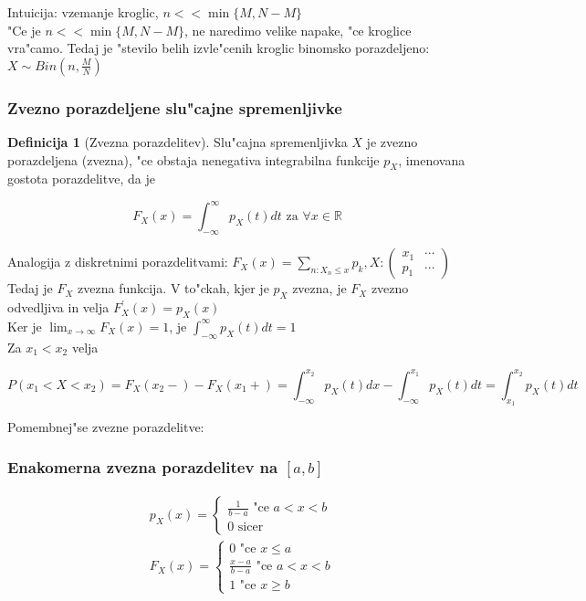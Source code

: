 \documentclass[a4paper,12pt]{article}
\theoremstyle{definition}
\newtheorem{defn}[counter]{Definicija}
\theoremstyle{remark}
\newcommand{\R}{\mathbb{R}}
\begin{document}
Intuicija: vzemanje kroglic, $n << \min\{M, N-M\}$ \\
"Ce je $n << \min\{M, N-M\}$, ne naredimo velike napake, "ce kroglice vra"camo. Tedaj je "stevilo belih
izvle"cenih kroglic binomsko porazdeljeno: $X \sim Bin(n, \frac{M}{N})$

\subsubsection{Zvezno porazdeljene slu"cajne spremenljivke}

\begin{defn}[Zvezna porazdelitev]
    Slu"cajna spremenljivka $X$ je zvezno porazdeljena (zvezna), "ce obstaja nenegativa integrabilna funkcije
    $p_X$, imenovana gostota porazdelitve, da je

    \begin{equation*}
        F_X(x) = \int_{-\infty}^{\infty} p_X(t) dt \text{ za } \forall x \in \R
    \end{equation*}
\end{defn}

Analogija z diskretnimi porazdelitvami: $F_X(x) = \sum_{n: X_n \leq x} p_k, X: \begin{pmatrix}
    x_1 & \cdots \\
    p_1 & \cdots
\end{pmatrix}$ \\
Tedaj je $F_X$ zvezna funkcija. V to"ckah, kjer je $p_X$ zvezna, je $F_X$ zvezno odvedljiva in velja
$F_X^{'}(x) = p_X(x)$ \\
Ker je $\lim_{x \to \infty} F_X(x) = 1$, je $\int_{-\infty}^{\infty} p_X(t) dt = 1$ \\
Za $x_1 < x_2$ velja

\begin{equation*}
    P(x_1 < X < x_2) = F_X(x_2-) - F_X(x_1+) = \int_{-\infty}^{x_2} p_X(t) dx - \int_{-\infty}^{x_1} p_X(t) dt =
    \int_{x_1}^{x_2} p_X(t) dt
\end{equation*}

Pomembnej"se zvezne porazdelitve:

\subsubsection{Enakomerna zvezna porazdelitev na $[a,b]$}

\begin{align*}
    &p_X(x) = \begin{cases}
            \frac{1}{b-a} \text{ "ce } a < x < b \\
            0 \text{ sicer}
        \end{cases} \\
    &F_X(x) = \begin{cases}
        0 \text{ "ce } x \leq a \\
        \frac{x-a}{b-a} \text{ "ce } a < x < b \\
        1 \text{ "ce } x \geq b
    \end{cases}
\end{align*}
\end{document}
